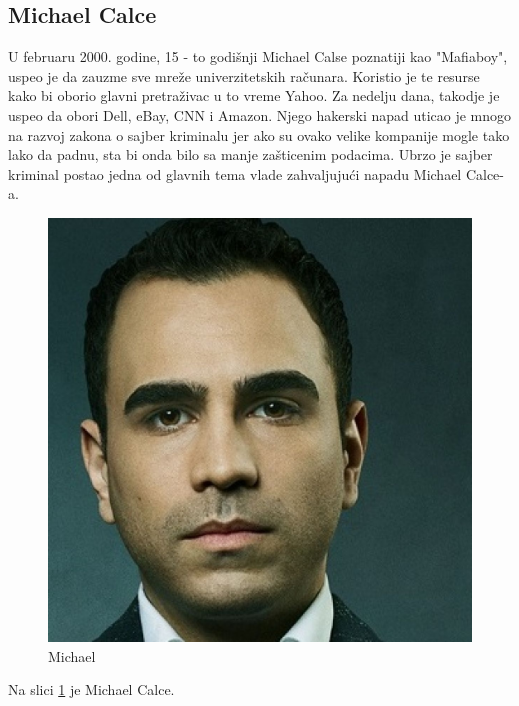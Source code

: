 \documentclass[a4paper]{article}
\begin{document}
\subsection{Michael Calce}
U februaru 2000. godine, 15 - to godišnji Michael Calse poznatiji kao "Mafiaboy", uspeo je da zauzme sve mreže univerzitetskih računara. Koristio je te resurse kako bi oborio glavni pretraživac u to vreme Yahoo. Za nedelju dana, takodje je uspeo da obori Dell, eBay, CNN i Amazon. Njego hakerski napad uticao je mnogo na razvoj zakona o sajber kriminalu jer ako su ovako velike kompanije mogle tako lako da padnu, sta bi onda bilo sa manje zašticenim podacima. Ubrzo je sajber kriminal postao jedna od glavnih tema vlade zahvaljujući napadu Michael Calce-a.
\begin{figure}[h!]
	\begin{center}
		\includegraphics[scale=0.10]{michael.jpg}
	\end{center}
	\caption{Michael}
	\label{fig:michael}
\end{figure}

Na slici \ref{fig:michael} je Michael Calce.
\end{document}
